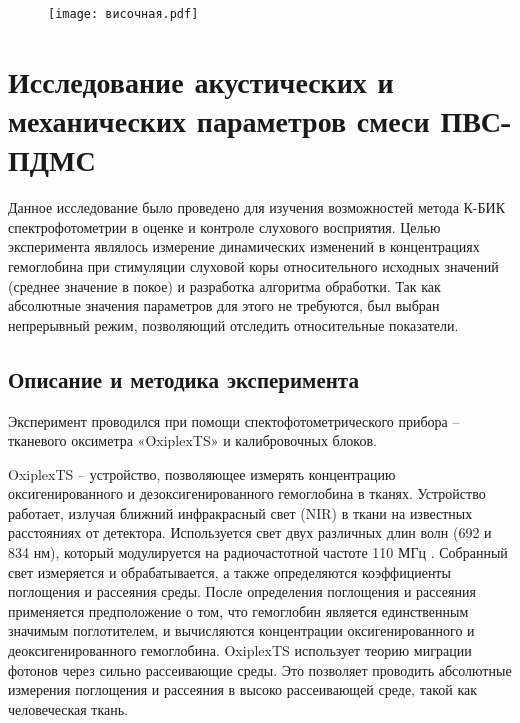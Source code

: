 \begin{figure}[!h]
\begin{center}
\texttt{[image: височная.pdf]}
\caption{\centering {}}
\label{vis}
\end{center}
\end{figure}

\section{Исследование акустических и механических параметров смеси ПВС-ПДМС}
Данное исследование было проведено для изучения возможностей метода К-БИК спектрофотометрии в оценке и контроле слухового восприятия. Целью эксперимента являлось измерение динамических изменений в концентрациях гемоглобина при стимуляции слуховой коры относительного исходных значений (среднее значение в покое) и разработка алгоритма обработки. Так как абсолютные значения параметров для этого не требуются, был выбран непрерывный режим, позволяющий отследить относительные показатели. 

\subsection{Описание и методика эксперимента}
Эксперимент проводился при помощи спектофотометрического прибора – тканевого оксиметра «OxiplexTS» и калибровочных блоков.

OxiplexTS – устройство, позволяющее измерять концентрацию оксигенированного и дезоксигенированного гемоглобина в тканях. Устройство работает, излучая ближний инфракрасный свет (NIR) в ткани на известных расстояниях от детектора. Используется свет двух различных длин волн (692 и 834 нм), который модулируется на радиочастотной частоте 110 МГц \cite{litlink26}. Собранный свет измеряется и обрабатывается, а также определяются коэффициенты поглощения и рассеяния среды. После определения поглощения и рассеяния применяется предположение о том, что гемоглобин является единственным значимым поглотителем, и вычисляются концентрации оксигенированного и деоксигенированного гемоглобина. OxiplexTS использует теорию миграции фотонов через сильно рассеивающие среды. Это позволяет проводить абсолютные измерения поглощения и рассеяния в высоко рассеивающей среде, такой как человеческая ткань.

